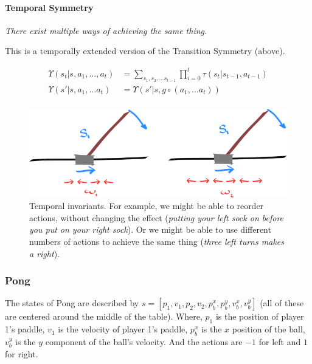 \paragraph{Temporal Symmetry}

\begin{displayquote}
  \textit{There exist multiple ways of achieving the same thing.}
\end{displayquote}

This is a temporally extended version of the Transition Symmetry (above).

\begin{align*}
\Upsilon(s_t | s, a_1, \dots, a_t) &= \sum_{s_1, s_2, \dots s_{t-1}}\prod_{i=0}^t \tau(s_t| s_{t-1}, a_{t-1}) \\
\Upsilon(s' | s, a_1, \dots a_t) &= \Upsilon(s' | s, g\circ (a_1, \dots a_t)) \\
\end{align*}

\begin{figure}[!h]
\centering
\includegraphics[width=1\textwidth,height=0.25\textheight]{../../pictures/drawings/cart-pole-temporal-approx.png}
\caption{Temporal invariants. For example, we might be able to reorder actions, without changing the effect (\textit{putting your left sock on before you put on your right sock}).
Or we might be able to use different numbers of actions to achieve the same thing (\textit{three left turns makes a right}).}
\end{figure}

\newpage
\subsubsection{Pong}

The states of Pong are described by $s = [p_1, v_1, p_2, v_2, p^x_b, p^y_b, v^x_b, v^y_b]$ (all of these are centered around the middle of the table). Where, $p_1$ is the position of player 1's paddle, $v_1$ is the velocity of player 1's paddle, $p^x_b$ is the $x$ position of the ball, $v^y_b$ is the $y$ component of the ball's velocity.
And the actions are $-1$ for left and $1$ for right.

